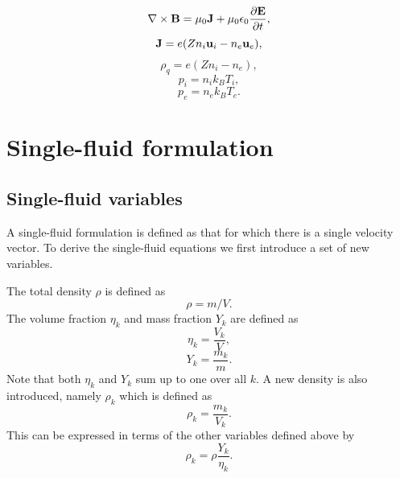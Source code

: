 \documentclass[a4paper,11pt]{report}
\begin{document}
\begin{equation}
    \label{eq:p_waves_maxwell_2}
    \nabla \times \mathbf{B} = \mu_0 \mathbf{J} + \mu_0 \epsilon_0 \frac{\partial \mathbf{E}}{\partial t},
\end{equation}
\begin{equation}
    \label{eq:p_waves_curr_density}
    \mathbf{J} = e (Z n_i \mathbf{u}_i - n_e \mathbf{u}_e),
\end{equation}
\begin{equation}
    \label{eq:p_waves_mass_density}
    \rho_q = e (Z n_i - n_e),
\end{equation}
\begin{equation}
    p_i = n_i k_B T_i,
\end{equation}
\begin{equation}
    p_e = n_e k_B T_e.
\end{equation}

\section{Single-fluid formulation}

\subsection{Single-fluid variables}
A single-fluid formulation is defined as that for which there is a single velocity vector. To derive the single-fluid equations we first introduce a set of new variables. 

The total density $\rho$ is defined as
\begin{equation}
    \rho = m/V.
\end{equation}
The volume fraction $\eta_k$ and mass fraction $Y_k$ are defined as
\begin{equation}
    \eta_k = \frac{V_k}{V},
\end{equation}
\begin{equation}
    Y_k = \frac{m_k}{m}.
\end{equation}
Note that both $\eta_k$ and $Y_k$ sum up to one over all $k$. A new density is also introduced, namely $\rho_k$ which is defined as
\begin{equation}
    \rho_k= \frac{m_k}{V_k}.
\end{equation}
This can be expressed in terms of the other variables defined above by
\begin{equation}
    \rho_k = \rho \frac{Y_k}{\eta_k}.
\end{equation}
\end{document}
